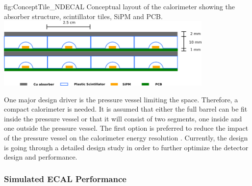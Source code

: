 \begin{dunefigure}{fig:ConceptTile_NDECAL}
  {Conceptual layout of the calorimeter showing the absorber structure, scintillator tiles, SiPM and PCB.}
\includegraphics[width=0.8\textwidth]{graphics/TileConcept.png}
\end{dunefigure}

One major design driver is the pressure vessel limiting the space. Therefore, a compact calorimeter is needed. It is assumed that either the full  barrel can be fit inside the pressure vessel or that it will consist of two segments, one inside and one outside the pressure vessel. The first option is preferred to reduce the impact of the pressure vessel on the calorimeter energy resolution \cite{Emberger:2018pgr}. Currently, the  design is going through a detailed design study in order to further optimize the detector design and performance.

\subsubsection{Simulated ECAL Performance}

